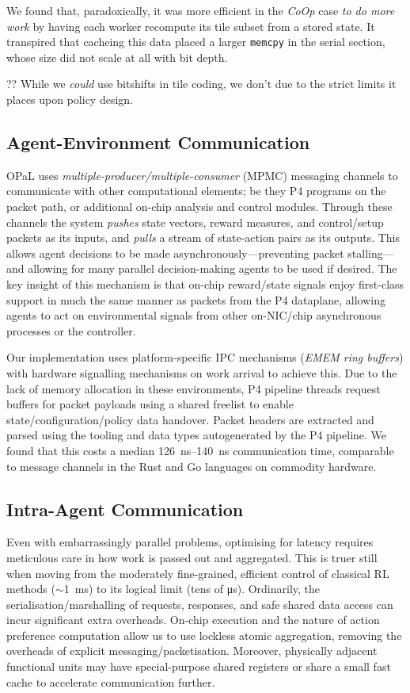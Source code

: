 \documentclass[sigconf,natbib=false]{acmart}
\newcommand{\approachshort}{OPaL}
\newcommand{\Coopfw}{\emph{CoOp}}
\begin{document}
We found that, paradoxically, it was more efficient in the \Coopfw{} case \emph{to do more work} by having each worker recompute its tile subset from a stored state.
It transpired that cacheing this data placed a larger \texttt{memcpy} in the serial section, whose size did not scale at all with bit depth.

?? While we \emph{could} use bitshifts in tile coding, we don't due to the strict limits it places upon policy design.

\subsection{Agent-Environment Communication}\label{sec:agent-environment-communication}
\approachshort{} uses \emph{multiple-producer/multiple-consumer} (MPMC) messaging channels to communicate with other computational elements; be they P4 programs on the packet path, or additional on-chip analysis and control modules.
Through these channels the system \emph{pushes} state vectors, reward measures, and control/setup packets as its inputs, and \emph{pulls} a stream of state-action pairs as its outputs.
This allows agent decisions to be made asynchronously---preventing packet stalling---and allowing for many parallel decision-making agents to be used if desired.
The key insight of this mechanism is that on-chip reward/state signals enjoy first-class support in much the same manner as packets from the P4 dataplane, allowing agents to act on environmental signals from other on-NIC/chip asynchronous processes or the controller.

Our implementation uses platform-specific IPC mechanisms (\emph{EMEM ring buffers}) with hardware signalling mechanisms on work arrival to achieve this.
Due to the lack of memory allocation in these environments, P4 pipeline threads request buffers for packet payloads using a shared freelist to enable state/configuration/policy data handover.
Packet headers are extracted and parsed using the tooling and data types autogenerated by the P4 pipeline.
We found that this costs a median \SIrange{126}{140}{\nano\second} communication time, comparable to message channels in the Rust and Go languages on commodity hardware.

\subsection{Intra-Agent Communication}
Even with embarrassingly parallel problems, optimising for latency requires meticulous care in how work is passed out and aggregated.
This is truer still when moving from the moderately fine-grained, efficient control of classical RL methods ($\sim$\SI{1}{\milli\second}) to its logical limit (tens of \si{\micro\second}).
Ordinarily, the serialisation/marshalling of requests, responses, and safe shared data access can incur significant extra overheads.
On-chip execution and the nature of action preference computation allow us to use lockless atomic aggregation, removing the overheads of explicit messaging/packetisation.
Moreover, physically adjacent functional units may have special-purpose shared registers or share a small fast cache to accelerate communication further.
\end{document}
